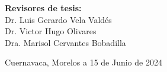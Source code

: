 \begin{titlepage}
\begin{minipage}{0.52\textwidth}
\begin{flushright}
\begin{center}
            \textbf{Revisores de tesis:}\\
    
            Dr. Luis Gerardo Vela Valdés\\
            Dr. Victor Hugo Olivares\\
            Dra. Marisol Cervantes Bobadilla\\
    
            
                \end{center}
        \end{flushright}
    \end{minipage}	
    \vspace*{3cm}
    
    \begin{flushright}
    {\large Cuernavaca, Morelos a 15 de Junio de 2024}
    \end{flushright}
    
\end{titlepage}